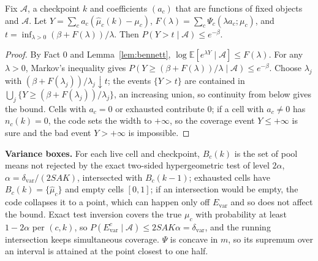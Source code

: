 \documentclass[sigconf,anonymous,review]{acmart}
\newcommand{\cA}{\mathcal{A}}
\newcommand{\dvar}{\delta_{\text{var}}}
\begin{document}
\begin{lemma}\label{lem:chernoff}
Fix $\cA$, a checkpoint $k$ and coefficients $(a_c)$ that are functions of fixed objects and $\cA$. Let $Y = \sum_c a_c(\hat\mu_c(k) - \mu_c)$, $F(\lambda) = \sum_c \Psi_c(\lambda a_c; \mu_c)$, and $t = \inf_{\lambda > 0}(\beta + F(\lambda))/\lambda$. Then $P(Y > t \mid \cA) \le e^{-\beta}$.
\end{lemma}
\begin{proof}
By Fact 0 and Lemma~\ref{lem:bennett}, $\log \mathbb{E}[e^{\lambda Y} \mid \cA] \le F(\lambda)$. For any $\lambda > 0$, Markov's inequality gives $P(Y \ge (\beta + F(\lambda))/\lambda \mid \cA) \le e^{-\beta}$. Choose $\lambda_j$ with $(\beta + F(\lambda_j))/\lambda_j \downarrow t$; the events $\{Y > t\}$ are contained in $\bigcup_j \{Y \ge (\beta+F(\lambda_j))/\lambda_j\}$, an increasing union, so continuity from below gives the bound. Cells with $a_c = 0$ or exhausted contribute 0; if a cell with $a_c \neq 0$ has $n_c(k) = 0$, the code sets the width to $+\infty$, so the coverage event $Y \le +\infty$ is sure and the bad event $Y > +\infty$ is impossible.
\end{proof}

\textbf{Variance boxes.} For each live cell and checkpoint, $B_c(k)$ is the set of pool means not rejected by the exact two-sided hypergeometric test of level $2\alpha$, $\alpha = \dvar/(2SAK)$, intersected with $B_c(k-1)$; exhausted cells have $B_c(k) = \{\hat\mu_c\}$ and empty cells $[0,1]$; if an intersection would be empty, the code collapses it to a point, which can happen only off $E_{\text{var}}$ and so does not affect the bound. Exact test inversion covers the true $\mu_c$ with probability at least $1 - 2\alpha$ per $(c,k)$, so $P(E_{\text{var}}^c \mid \cA) \le 2SAK\alpha = \dvar$, and the running intersection keeps simultaneous coverage. $\Psi$ is concave in $m$, so its supremum over an interval is attained at the point closest to one half.
\end{document}

